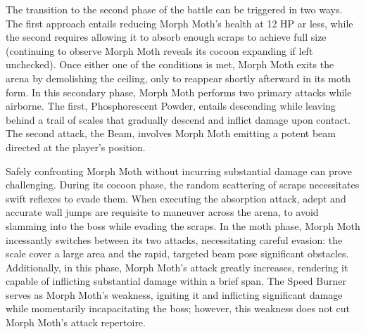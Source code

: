 The transition to the second phase of the battle can be triggered in two ways. The first approach entails reducing Morph Moth's health at 12 HP ar less, while the second requires allowing it to absorb enough scraps to achieve full size (continuing to observe Morph Moth reveals its cocoon expanding if left unchecked). Once either one of the conditions is met, Morph Moth exits the arena by demolishing the ceiling, only to reappear shortly afterward in its moth form. In this secondary phase, Morph Moth performs two primary attacks while airborne. The first, Phosphorescent Powder, entails descending while leaving behind a trail of scales that gradually descend and inflict damage upon contact. The second attack, the Beam, involves Morph Moth emitting a potent beam directed at the player's position.

Safely confronting Morph Moth without incurring substantial damage can prove challenging. During its cocoon phase, the random scattering of scraps necessitates swift reflexes to evade them. When executing the absorption attack, adept and accurate wall jumps are requisite to maneuver across the arena, to avoid slamming into the boss while evading the scraps. In the moth phase, Morph Moth incessantly switches between its two attacks, necessitating careful evasion: the scale cover a large area and the rapid, targeted beam pose significant obstacles. Additionally, in this phase, Morph Moth's attack greatly increases, rendering it capable of inflicting substantial damage within a brief span. The Speed Burner serves as Morph Moth's weakness, igniting it and inflicting significant damage while momentarily incapacitating the boss; however, this weakness does not cut Morph Moth's attack repertoire.

